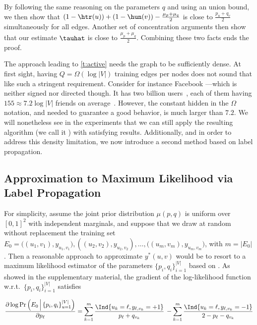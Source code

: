 By following the same reasoning on the parameters $q$ and using an union bound, we then show that
$\left(1-\htr(u)\right) + \left(1-\hun(v)\right) - \frac{\mu_p+\mu_q}{2}$ is close to
$\frac{p_u+q_v}{2}$ simultaneously for all edges. Another set of concentration arguments then show
that our estimate $\tauhat$ is close to $\frac{\mu_p+\mu_q}{2}$. Combining these two facts ends the
proof.

\medskip

The approach leading to \autoref{t:active} needs the graph to be sufficiently dense. At first sight,
having $Q = \Omega(\log|V|)$ training edges per nodes does not sound that like such a stringent
requirement. Consider for instance Facebook ---which is neither signed nor directed though. It has
two billion
users~,
each of them having $155\approx 7.2\log|V|$ friends on average~\autocite{facebookFriend16}. However,
the constant hidden in the $\Omega$ notation, and needed to guarantee a good behavior, is much
larger than $7.2$. We will nonetheless see in the experiments that we can still apply the resulting
algorithm (we call it \usrule{}) with satisfying results. Additionally, and in order to address this
density limitation, we now introduce a second method based on label propagation.

\subsection{Approximation to Maximum Likelihood via Label Propagation}\label{ss:passive}

For simplicity, assume the joint prior distribution $\mu(p,q)$ is uniform over $[0,1]^2$ with
independent marginals, and suppose that we draw at random without replacement the training set $E_0
= \big((u_1,v_1),y_{u_1,v_1}), ((u_2,v_2),y_{u_2,v_2}), \ldots, ((u_m,v_m),y_{u_m,v_m}\big)$, with
$m = |E_0|$. Then a reasonable approach to approximate $y^*(u,v)$ would be to resort to a maximum
likelihood estimator of the parameters $\{p_i, q_i\}_{i=1}^{|V|}$ based on \trainset{}.
As showed in the supplementary material, the gradient of the log-likelihood function w.r.t.\ $\{p_i,
q_i\}_{i=1}^{|V|}$ satisfies

\begin{equation}\label{e:mlp}
\frac{\partial \log \Pr\left(E_0 \,\Big|\, \{p_i, q_i\}_{u=1}^{|V|}\right)}{\partial p_{\ell}}
=
\sum_{k=1}^m
\frac{\Ind{u_k = \ell,y_{\ell,v_k}=+1}}{p_{\ell}+q_{v_k}}\,
- \sum_{k=1}^m
\frac{\Ind{u_k = \ell,y_{\ell,v_k}=-1}}{2-p_{\ell}-q_{v_k}}
\end{equation}

